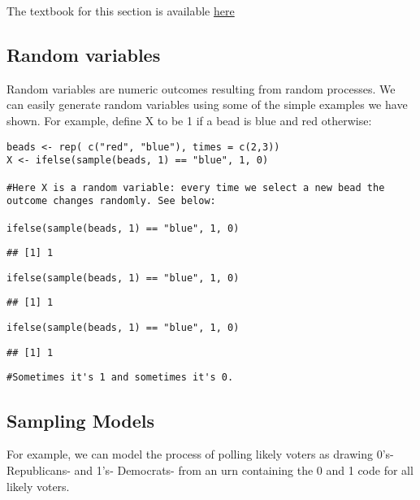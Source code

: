 \documentclass[
]{article}
\begin{document}
The textbook for this section is available
\href{https://rafalab.github.io/dsbook/random-variables.html}{here}

\hypertarget{random-variables}{%
\subsection{Random variables}\label{random-variables}}

Random variables are numeric outcomes resulting from random processes.
We can easily generate random variables using some of the simple
examples we have shown. For example, define X to be 1 if a bead is blue
and red otherwise:

\begin{verbatim}
beads <- rep( c("red", "blue"), times = c(2,3))
X <- ifelse(sample(beads, 1) == "blue", 1, 0)

#Here X is a random variable: every time we select a new bead the outcome changes randomly. See below:

ifelse(sample(beads, 1) == "blue", 1, 0)
\end{verbatim}

\begin{verbatim}
## [1] 1
\end{verbatim}

\begin{verbatim}
ifelse(sample(beads, 1) == "blue", 1, 0)
\end{verbatim}

\begin{verbatim}
## [1] 1
\end{verbatim}

\begin{verbatim}
ifelse(sample(beads, 1) == "blue", 1, 0)
\end{verbatim}

\begin{verbatim}
## [1] 1
\end{verbatim}

\begin{verbatim}
#Sometimes it's 1 and sometimes it's 0.
\end{verbatim}

\hypertarget{sampling-models}{%
\subsection{Sampling Models}\label{sampling-models}}

For example, we can model the process of polling likely voters as
drawing 0's- Republicans- and 1's- Democrats- from an urn containing the
0 and 1 code for all likely voters.
\end{document}
